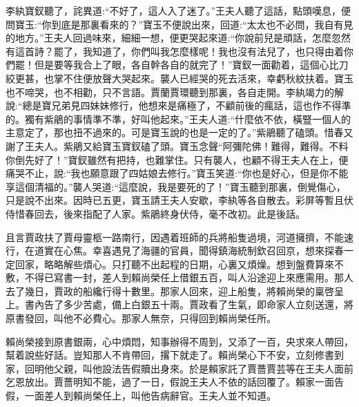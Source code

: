 \begin{parag}
    李紈寶釵聽了，詫異道:“不好了，這人入了迷了。”王夫人聽了這話，點頭嘆息，便問寶玉:“你到底是那裏看來的？”寶玉不便說出來，回道:“太太也不必問，我自有見的地方。”王夫人回過味來，細細一想，便更哭起來道:“你說前兒是頑話，怎麼忽然有這首詩？罷了，我知道了，你們叫我怎麼樣呢！我也沒有法兒了，也只得由着你們罷！但是要等我合上了眼，各自幹各自的就完了！”寶釵一面勸着，這個心比刀絞更甚，也掌不住便放聲大哭起來。襲人已經哭的死去活來，幸虧秋紋扶着。寶玉也不啼哭，也不相勸，只不言語。賈蘭賈環聽到那裏，各自走開。李紈竭力的解說:“總是寶兄弟見四妹妹修行，他想來是痛極了，不顧前後的瘋話，這也作不得準的。獨有紫鵑的事情準不準，好叫他起來。”王夫人道:“什麼依不依，橫豎一個人的主意定了，那也扭不過來的。可是寶玉說的也是一定的了。”紫鵑聽了磕頭。惜春又謝了王夫人。紫鵑又給寶玉寶釵磕了頭。寶玉念聲“阿彌陀佛！難得，難得。不料你倒先好了！”寶釵雖然有把持，也難掌住。只有襲人，也顧不得王夫人在上，便痛哭不止，說:“我也願意跟了四姑娘去修行。”寶玉笑道:“你也是好心，但是你不能享這個清福的。”襲人哭道:“這麼說，我是要死的了！”寶玉聽到那裏，倒覺傷心，只是說不出來。因時已五更，寶玉請王夫人安歇，李紈等各自散去。彩屏等暫且伏侍惜春回去，後來指配了人家。紫鵑終身伏侍，毫不改初。此是後話。
\end{parag}


\begin{parag}
    且言賈政扶了賈母靈柩一路南行，因遇着班師的兵將船隻過境，河道擁擠，不能速行，在道實在心焦。幸喜遇見了海疆的官員，聞得鎮海統制欽召回京，想來探春一定回家，略略解些煩心。只打聽不出起程的日期，心裏又煩燥。想到盤費算來不敷，不得已寫書一封，差人到賴尚榮任上借銀五百，叫人沿途迎上來應需用。那人去了幾日，賈政的船纔行得十數里。那家人回來，迎上船隻，將賴尚榮的稟啓呈上。書內告了多少苦處，備上白銀五十兩。賈政看了生氣，即命家人立刻送還，將原書發回，叫他不必費心。那家人無奈，只得回到賴尚榮任所。
\end{parag}


\begin{parag}
    賴尚榮接到原書銀兩，心中煩悶，知事辦得不周到，又添了一百，央求來人帶回，幫着說些好話。豈知那人不肯帶回，撂下就走了。賴尚榮心下不安，立刻修書到家，回明他父親，叫他設法告假贖出身來。於是賴家託了賈薔賈芸等在王夫人面前乞恩放出。賈薔明知不能，過了一日，假說王夫人不依的話回覆了。賴家一面告假，一面差人到賴尚榮任上，叫他告病辭官。王夫人並不知道。
\end{parag}


